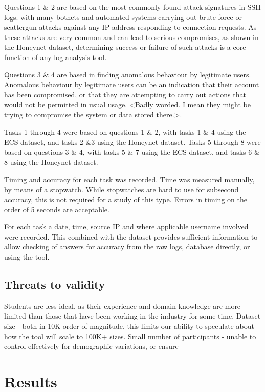 Questions 1 \& 2 are based on the most commonly found attack signatures in SSH logs. with many botnets and automated systems carrying out brute force or scattergun attacks against any IP address responding to connection requests. As these attacks are very common and can lead to serious compromises, as shown in the Honeynet dataset, determining success or failure of such attacks is a core function of any log analysis tool. 

Questions 3 \& 4 are based in finding anomalous behaviour by legitimate users. Anomalous behaviour by legitimate users can be an indication that their account has been compromised, or that they are attempting to carry out actions that would not be permitted in usual usage. <Badly worded. I mean they might be trying to compromise the system or data stored there.>. 

Tasks 1 through 4 were based on questions 1 \& 2, with tasks 1 \& 4 using the ECS dataset, and tasks 2 \&3 using the Honeynet dataset.
Tasks 5 through 8 were based on questions 3 \& 4, with tasks 5 \& 7 using the ECS dataset, and tasks 6 \& 8 using  the Honeynet dataset. 

Timing and accuracy for each task was recorded. 
Time was measured manually, by means of a stopwatch. While stopwatches are hard to use for subsecond accuracy, this is not required for a study of this type. Errors in timing on the order of 5 seconds are acceptable.

For each task a date, time, source IP and where applicable username involved were recorded. This combined with the dataset provides sufficient information to allow checking of answers for accuracy from the raw logs, database directly, or using the tool. 

\subsection{Threats to validity}
 Students are less ideal, as their experience and domain knowledge are more limited than those that have been working in the industry for some time.
Dataset size - both in 10K order of magnitude, this limits our ability to speculate about how the tool will scale to 100K+ sizes. 
Small number of participants - unable to control effectively for demographic variations, or ensure 

\section{Results}

